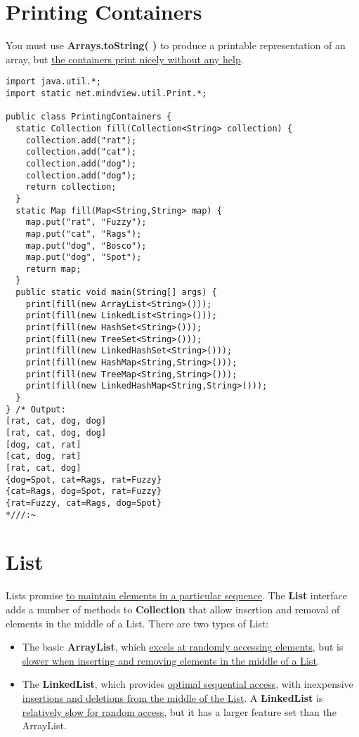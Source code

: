 \documentclass[10pt,letterpaper]{report}
\begin{document}
\section{Printing Containers}
You must use \textbf{Arrays.toString( )} to produce a printable representation of an array, but \underline{the containers print nicely without any help}.

\begin{lstlisting}
import java.util.*;
import static net.mindview.util.Print.*;

public class PrintingContainers {
  static Collection fill(Collection<String> collection) {
    collection.add("rat");
    collection.add("cat");
    collection.add("dog");
    collection.add("dog");
    return collection;
  }
  static Map fill(Map<String,String> map) {
    map.put("rat", "Fuzzy");
    map.put("cat", "Rags");
    map.put("dog", "Bosco");
    map.put("dog", "Spot");
    return map;
  }	
  public static void main(String[] args) {
    print(fill(new ArrayList<String>()));
    print(fill(new LinkedList<String>()));
    print(fill(new HashSet<String>()));
    print(fill(new TreeSet<String>()));
    print(fill(new LinkedHashSet<String>()));
    print(fill(new HashMap<String,String>()));
    print(fill(new TreeMap<String,String>()));
    print(fill(new LinkedHashMap<String,String>()));
  }
} /* Output:
[rat, cat, dog, dog]
[rat, cat, dog, dog]
[dog, cat, rat]
[cat, dog, rat]
[rat, cat, dog]
{dog=Spot, cat=Rags, rat=Fuzzy}
{cat=Rags, dog=Spot, rat=Fuzzy}
{rat=Fuzzy, cat=Rags, dog=Spot}
*///:~
\end{lstlisting}
\section{List}
Lists promise \underline{to maintain elements in a particular sequence}. The \textbf{List} interface adds a number of methods to \textbf{Collection} that allow insertion and removal of elements in the middle of a List.
There are two types of List:
\begin{itemize}
\item The basic \textbf{ArrayList}, which \underline{excels at randomly accessing elements}, but is \underline{slower when inserting and removing elements in the middle of a List}.
\item The \textbf{LinkedList}, which provides \underline{optimal sequential access}, with inexpensive \underline{insertions and deletions from the middle of the List}. A \textbf{LinkedList} is \underline{relatively slow for random access}, but it has a larger feature set than the ArrayList.
\end{itemize}
\end{document}
